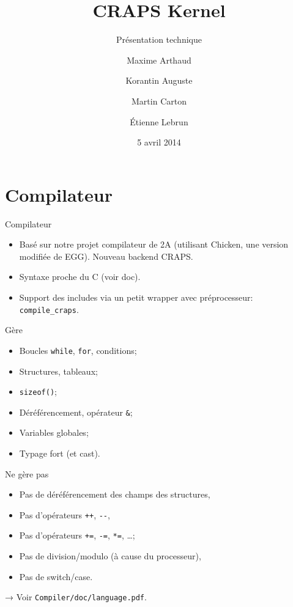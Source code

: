 \documentclass{beamer}
\title{CRAPS Kernel}
\subtitle{Présentation technique}
\author{
       Maxime Arthaud
  \and Korantin Auguste
  \and Martin Carton
  \and Étienne Lebrun
}
\date{5 avril 2014}
\begin{document}
  \begin{frame}
    \titlepage%
  \end{frame}

  \section{Compilateur}
    \begin{frame}[fragile]{Compilateur}
      \begin{itemize}
        \item Basé sur notre projet compilateur de 2A (utilisant Chicken, une version modifiée de EGG). Nouveau
          backend CRAPS.
        \item Syntaxe proche du C (voir doc).
        \item Support des includes via un petit wrapper avec préprocesseur:
          \verb+compile_craps+.
      \end{itemize}
\end{frame}

    \begin{frame}[fragile]{Gère}
      \begin{itemize}
        \item Boucles \verb+while+, \verb+for+, conditions;
        \item Structures, tableaux;
        \item \verb+sizeof()+;
        \item Déréférencement, opérateur \verb+&+;
        \item Variables globales;
        \item Typage fort (et cast).
      \end{itemize}
\end{frame}

    \begin{frame}[fragile]{Ne gère pas}
      \begin{itemize}
        \item Pas de déréférencement des champs des structures,
        \item Pas d'opérateurs \verb|++|, \verb|--|,
        \item Pas d'opérateurs \verb|+=|, \verb|-=|, \verb|*=|, \dots;
        \item Pas de division/modulo (à cause du processeur),
        \item Pas de switch/case.
      \end{itemize}

      \pause
      → Voir \verb+Compiler/doc/language.pdf+.
\end{frame}
\end{document}
